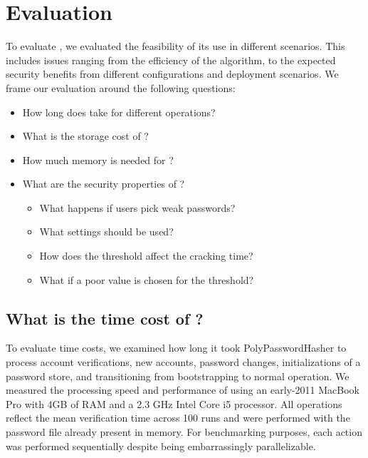 \section{Evaluation}
\label{SEC:evaluation}


To evaluate \PPH, we evaluated the feasibility of its use 
in different scenarios.  This includes issues ranging from the efficiency
of the algorithm, to the expected security benefits from different 
configurations and deployment scenarios.  We frame our evaluation around
the following questions:

\begin{itemize}
    \item How long does \PPH take for different operations?
    \item What is the storage cost of \PPH?
    \item How much memory is needed for \PPH?
    \item What are the security properties of \PPH?
        \begin{itemize}
            \item What happens if users pick weak passwords?
            \item What \partialbytes settings should be used?
            \item How does the threshold affect the cracking time?
            \item What if a poor value is chosen for the threshold?
        \end{itemize}
\end{itemize}


\subsection{What is the time cost of \PPH?}
\label{SUBSEC:time-costs}

To evaluate time costs, we examined how long it took PolyPasswordHasher to
process account verifications, new accounts, password changes, initializations
of a password store, and transitioning from bootstrapping to normal operation.
We measured the processing speed and performance of \PPH using an early-2011
MacBook Pro with 4GB of RAM and a 2.3 GHz Intel Core i5 processor.  All
operations reflect the mean verification time across 100 runs and were
performed with the password file already present in memory. For benchmarking
purposes, each action was performed sequentially despite being embarrassingly
parallelizable.

